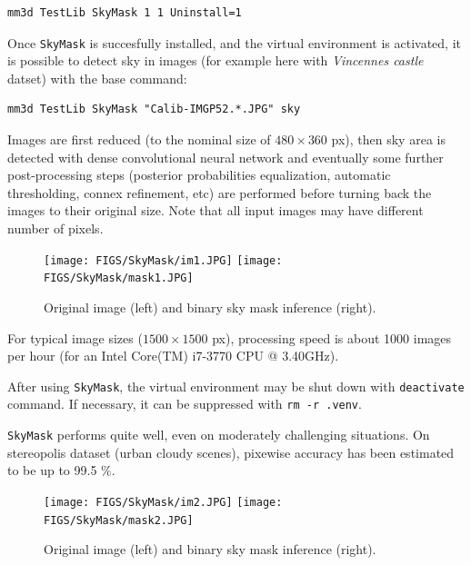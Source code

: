 \begin{verbatim}
mm3d TestLib SkyMask 1 1 Uninstall=1
\end{verbatim}

\noindent Once \texttt{SkyMask} is succesfully installed, and the virtual environment is activated, it is possible to detect sky in images (for example here with \textit{Vincennes castle} datset) with the base command: \newline

\begin{verbatim}
mm3d TestLib SkyMask "Calib-IMGP52.*.JPG" sky
\end{verbatim}

\noindent Images are first reduced (to the nominal size of $480\times360$ px), then sky area is detected with dense convolutional neural network and eventually some further post-processing steps (posterior probabilities equalization, automatic thresholding, connex refinement, etc) are performed before turning back the images to their original size. Note that all input images may have different number of pixels. \newline

\begin{figure}[!h]
	\begin{center}
		\texttt{[image: FIGS/SkyMask/im1.JPG]}
		\hspace{0.2cm}
		\texttt{[image: FIGS/SkyMask/mask1.JPG]}
		\caption{Original image (left) and binary sky mask inference (right).}
	\end{center}	
\end{figure}


\noindent For typical image sizes ($1500 \times 1500$ px), processing speed is about 1000 images per hour (for an Intel Core(TM) i7-3770 CPU @ 3.40GHz). \newline

\noindent After using \texttt{SkyMask}, the virtual environment may be shut down with \texttt{deactivate} command. If necessary, it can be suppressed with \texttt{rm -r .venv}. \newline

\noindent \texttt{SkyMask} performs quite well, even on moderately challenging situations. On stereopolis dataset (urban cloudy scenes), pixewise accuracy has been estimated to be up to 99.5 \%. \newline

\begin{figure}[!h]
	\begin{center}
		\texttt{[image: FIGS/SkyMask/im2.JPG]}
		\hspace{0.2cm}
		\texttt{[image: FIGS/SkyMask/mask2.JPG]}
		\caption{Original image (left) and binary sky mask inference (right).}
	\end{center}	
\end{figure}

